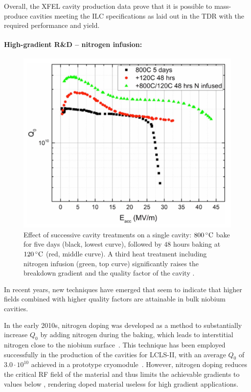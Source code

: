 Overall, the XFEL cavity production data prove that it is possible to mass-produce cavities meeting the ILC specifications as laid out in the TDR with the required performance and yield.


\paragraph{High-gradient R\&D -- nitrogen infusion:}
\label{par:infusion}

\begin{figure}[htbp]
   \includegraphics[width=\hsize]{chapters/figures/sst-30-094004-fig5}
\caption{Effect of successive cavity treatments on a single cavity: $800\,{\mathrm{^\circ C}}$ bake for five days (black, lowest curve), followed by $48$ hours baking at $120\,{\mathrm{^\circ C}}$ (red, middle curve). 
A third heat treatment including nitrogen infusion (green, top curve) significantly  raises the breakdown gradient and the quality factor of the cavity
\cite[Fig. 5]{Grassellino:2017bod}.
}
\label{fig:n2infusion}
\end{figure}

In recent years, new techniques have emerged that seem to indicate that higher fields combined with higher quality factors are attainable in bulk niobium cavities.

In the early 2010s, nitrogen doping was developed as a method to substantially increase $Q_0$ by adding nitrogen during the  baking, which leads to interstitial nitrogen close to the niobium surface~\cite{Grassellino:2013nza}.
This technique has been employed successfully in the production of the cavities for LCLS-II, with an average $Q_0$ of $3.0\cdot 10^{10}$ achieved in a prototype cryomodule~\cite{Wu:2018qyl}.
However, nitrogen doping reduces the critical RF field of the material and thus limits the achievable gradients to values below , rendering doped material useless for high gradient applications.

